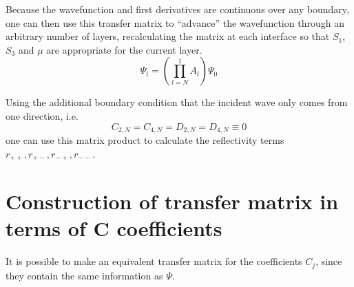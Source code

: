 \documentclass[%
 reprint,
 amsmath,
 amssymb,
 aps,
 prl,
 lengthcheck,%
]{revtex4-1}
\begin{document}
Because the wavefunction and first derivatives are continuous over any boundary,
one can then use this transfer matrix to ``advance'' the wavefunction through
an arbitrary number of layers, recalculating the matrix at each interface so that
$S_1$, $S_3$ and $\mu$ are appropriate for the current layer.
\begin{equation}
  \displaystyle \Psi_l = \left( \prod_{l=N}^1 A_l \right) \Psi_0
\end{equation}

Using the additional boundary condition that
the incident wave only comes from one direction, i.e.
\begin{equation}
  C_{2,N} = C_{4,N} = D_{2,N} = D_{4,N} \equiv 0
\end{equation}
one can use this matrix product to calculate the reflectivity terms 
$r_{++}, r_{+-}, r_{-+}, r_{--}$.

\section{Construction of transfer matrix in terms of C coefficients}

It is possible to make an equivalent transfer matrix for the coefficients $C_j$, 
since they contain the same information as $\Psi$.
\end{document}
